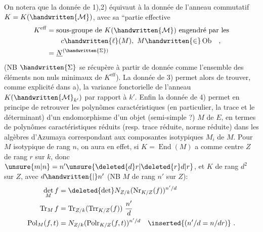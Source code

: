 On notera que la donnée de 1),2) équivaut à la donnée de l'anneau commutatif $K=K(\handwritten{\mathcal{M}})$, avec sa ``partie effective
\[
\begin{aligned}
K^{\mathrm{eff}}&=\text{sous-groupe de }K(\handwritten{\mathcal{M}})\text{ engendré par les}\\
&\qquad c\handwritten{\ell}(M),\ M\handwritten{\in}\operatorname{Ob}\quad,\\
&=\underline{N}^{(\handwritten{\Sigma})}
\end{aligned}
\]
(NB $\handwritten{\Sigma}$ se récupère à partir de  donnée comme l'ensemble des éléments non nuls minimaux de $K^{\mathrm{eff}}$). La donnée de 3) permet alors de trouver, comme explicité dans a), la variance fonctorielle de l'anneau $K(\handwritten{\mathcal{M}}_{k'})$ par rapport à $k'$. Enfin la donnée de 4) permet en principe de retrouver les polynômes caractéristiques (en particulier, la trace et le déterminant) d'un endomorphisme d'un objet (semi-simple ?) $M$ de $E$, en termes de polynômes caractéristiques réduits (resp. trace réduite, norme réduite) dans les algèbres d'Azumaya correspondant aux composantes isotypiques $M_i$ de $M$. Pour $M$ isotypique de rang $n$, on aura en effet, si $K=\operatorname{End}(M)$ a comme centre $Z$ de rang $r$ sur $k$, donc $\unsure{m|n}=n'\unsure{\deleted{d}r|\deleted{r}d|r}$, et $K$ de rang $d^2$ sur $Z$, avec $d\handwritten{\mid}n'$ (NB $M$ de rang $n'$ sur $Z$):
\[
\begin{aligned}
\det_M f&=\deleted{\det}N_{Z/k}(\operatorname{Nr}_{K/Z}(f))^{n'/d}\\
\operatorname{Tr}_M f&=\operatorname{Tr}_{Z/k}(\operatorname{Trr}_{K/Z}(f))\ \frac{n'}{d}\\
\operatorname{Pol}_M(f,t)&=N_{Z/k}(\operatorname{Polr}_{K/Z}(f,t))^{n'/d}\quad\inserted{(n'/d=n/dr)}\ .
\end{aligned}
\]

